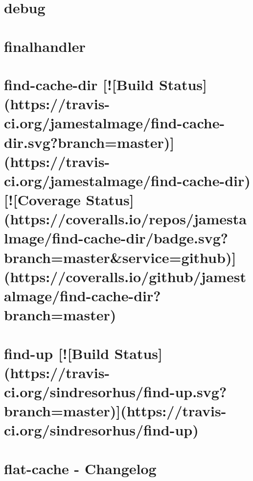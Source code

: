 \documentclass[twoside]{book}
\newcommand{\+}{\discretionary{\mbox{\scriptsize$\hookleftarrow$}}{}{}}
\begin{document}
\chapter{debug}
\label{md__c_1_workspace_demo_src_main_script_node_modules_finalhandler_node_modules_debug__r_e_a_d_m_e}

\chapter{finalhandler}
\label{md__c_1_workspace_demo_src_main_script_node_modules_finalhandler__r_e_a_d_m_e}

\chapter{find-\/cache-\/dir \mbox{[}!\mbox{[}Build Status\mbox{]}(https\+://travis-\/ci.org/jamestalmage/find-\/cache-\/dir.svg?branch=master)\mbox{]}(https\+://travis-\/ci.org/jamestalmage/find-\/cache-\/dir) \mbox{[}!\mbox{[}Coverage Status\mbox{]}(https\+://coveralls.io/repos/jamestalmage/find-\/cache-\/dir/badge.svg?branch=master\&service=github)\mbox{]}(https\+://coveralls.io/github/jamestalmage/find-\/cache-\/dir?branch=master)}
\label{md__c_1_workspace_demo_src_main_script_node_modules_find-cache-dir_readme}

\chapter{find-\/up \mbox{[}!\mbox{[}Build Status\mbox{]}(https\+://travis-\/ci.org/sindresorhus/find-\/up.svg?branch=master)\mbox{]}(https\+://travis-\/ci.org/sindresorhus/find-\/up)}
\label{md__c_1_workspace_demo_src_main_script_node_modules_find-up_readme}

\chapter{flat-\/cache -\/ Changelog}
\label{md__c_1_workspace_demo_src_main_script_node_modules_flat-cache_changelog}

\end{document}
